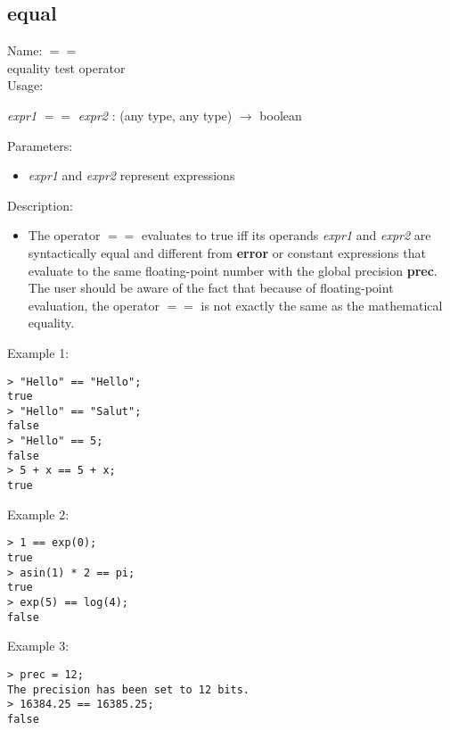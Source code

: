 \subsection{equal}
\label{labequal}
\noindent Name: \textbf{$==$}\\
equality test operator\\

\noindent Usage: 
\begin{center}
\emph{expr1} \textbf{$==$} \emph{expr2} : (\textsf{any type}, \textsf{any type}) $\rightarrow$ \textsf{boolean}\\
\end{center}
Parameters: 
\begin{itemize}
\item \emph{expr1} and \emph{expr2} represent expressions
\end{itemize}
\noindent Description: \begin{itemize}

\item The operator \textbf{$==$} evaluates to true iff its operands \emph{expr1} and
   \emph{expr2} are syntactically equal and different from \textbf{error} or constant
   expressions that evaluate to the same floating-point number with the
   global precision \textbf{prec}. The user should be aware of the fact that
   because of floating-point evaluation, the operator \textbf{$==$} is not
   exactly the same as the mathematical equality.
\end{itemize}
\noindent Example 1: 
\begin{center}\begin{minipage}{15cm}\begin{Verbatim}[frame=single]
> "Hello" == "Hello";
true
> "Hello" == "Salut";
false
> "Hello" == 5;
false
> 5 + x == 5 + x;
true
\end{Verbatim}
\end{minipage}\end{center}
\noindent Example 2: 
\begin{center}\begin{minipage}{15cm}\begin{Verbatim}[frame=single]
> 1 == exp(0);
true
> asin(1) * 2 == pi;
true
> exp(5) == log(4);
false
\end{Verbatim}
\end{minipage}\end{center}
\noindent Example 3: 
\begin{center}\begin{minipage}{15cm}\begin{Verbatim}[frame=single]
> prec = 12;
The precision has been set to 12 bits.
> 16384.25 == 16385.25;
false
\end{Verbatim}
\end{minipage}\end{center}
